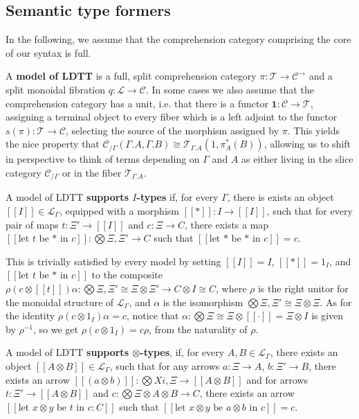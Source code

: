 \subsection{Semantic type formers}
In the following, we assume that the comprehension category comprising the core of our syntax is full. \begin{defn}A \textbf{model of LDTT} is a full, split comprehension category $\pi : \mathcal{T} \to \mathcal{C}^{\to}$ and a split monoidal fibration $q : \mathcal{L} \to \mathcal{C}$. In some cases we also assume that the comprehension category has a unit, i.e. that there is a functor $\mathbf{1} : \mathcal{C} \to \mathcal{T}$, assigning a terminal object to every fiber which is a left adjoint to the functor $s(\pi) : \mathcal{T} \to \mathcal{C}$, selecting the source of the morphism assigned by $\pi$. This yields the nice property that $\mathcal{C}_{/\Gamma}(\Gamma.A, \Gamma.B) \cong \mathcal{T}_{\Gamma.A}(1, \pi_A^*(B))$, allowing us to shift in perspective to think of terms depending on $\Gamma$ and $A$ as either living in the slice category $\mathcal{C}_{/\Gamma}$ or in the fiber $\mathcal{T}_{\Gamma.A}$.
\end{defn}
\begin{defn}
  A model of LDTT \textbf{supports $I$-types} if, for every $\Gamma$, there is exists an object $[[I]] \in \mathcal{L}_{\Gamma}$, equipped with a morphism $[[*]] : I \to [[I]]$, such that for every pair of maps $t : \Xi' \to [[I]]$ and $c : \Xi \to C$, there exists a map $[[\text{let $t$ be * in $c$}]] : \bigotimes \Xi, \Xi' \to C$ such that $[[\text{let * be * in $c$}]] = c$.
\end{defn}
This is trivially satisfied by every model by setting $[[I]] = I$, $[[*]] = 1_{I}$, and $[[\text{let $t$ be * in $c$}]]$ to the composite $\rho (c \otimes [[t]]) \alpha  : \bigotimes \Xi, \Xi' \cong \Xi \otimes \Xi' \to C \otimes I \cong C$, where $\rho$ is the right unitor for the monoidal structure of $\mathcal{L}_{\Gamma}$, and $\alpha$ is the isomorphism $\bigotimes \Xi, \Xi' \cong \Xi \otimes \Xi$. As for the identity $\rho(c \otimes 1_{I}) \alpha = c$, notice that $\alpha : \bigotimes \Xi \cong \Xi \otimes [[\cdot]] = \Xi \otimes I$ is given by $\rho^{-1}$, so we get $\rho (c \otimes 1_I) = c \rho$, from the naturality of $\rho$.\\
\begin{defn}
  A model of LDTT \textbf{supports $\otimes$-types}, if, for every $A, B \in \mathcal{L}_{\Gamma}$, there exists an object $[[A \otimes B]] \in \mathcal{L}_{\Gamma}$, such that for any arrows $a : \Xi \to A$, $b : \Xi' \to B$, there exists an arrow $[[(a \otimes b)]] : \bigotimes Xi, \Xi \to [[A \otimes B]]$ and for arrows $t : \Xi' \to [[A \otimes B]]$ and $c : \bigotimes \Xi \otimes A \otimes B \to C$, there exists an arrow $[[\text{let $x \otimes y$ be $t$ in $c : C$}]]$ such that $[[\text{let $x \otimes y$ be $a \otimes b$ in $c$}]] = c$.
\end{defn}
